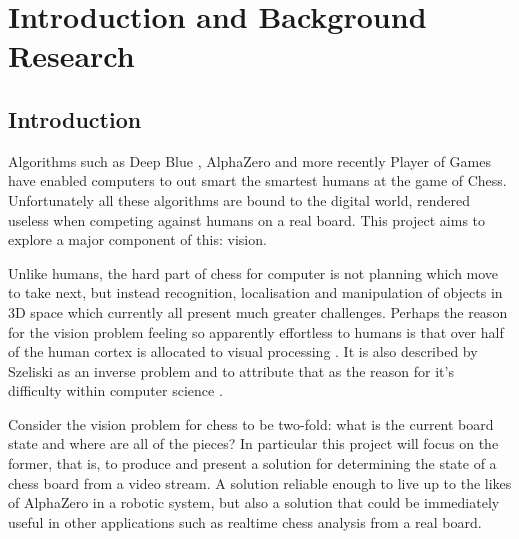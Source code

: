 \chapter{Introduction and Background Research}

\label{chapter1}

\section{Introduction}

Algorithms such as Deep Blue \cite{CAMPBELL200257}, AlphaZero \cite{silver2018general} and more recently Player of Games\cite{schmid2021player}
have enabled computers to out smart the smartest humans at the game of Chess.
Unfortunately all these algorithms are bound to the digital world, rendered useless when
competing against humans on a real board.  This project aims to explore a major component of this: vision.

Unlike humans, the hard part of chess for computer is not planning which move to take next, but instead recognition, 
localisation and manipulation of objects in 3D space which currently all present much greater challenges.
Perhaps the reason for the vision problem feeling so apparently effortless to humans is that over half of the human cortex is allocated 
to visual processing \cite{snowden2012basic}.
It is also described by Szeliski as an inverse problem and to attribute that as the reason for it's difficulty
within computer science \cite{szeliski2011computer}.

Consider the vision problem for chess to be two-fold: what is the current board state and where are all of the pieces?  
In particular this project will focus on the former, that is, to produce and present a solution for determining the
state of a chess board from a video stream.  A solution reliable enough to live up to the likes of AlphaZero 
in a robotic system,
but also a solution that could be immediately useful in other applications such as realtime chess analysis from a real board.

